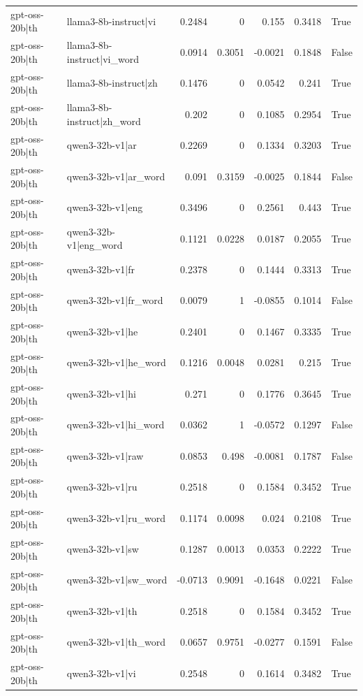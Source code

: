 \begin{table}
\begin{tabular}{l l r r r r l}
gpt-oss-20b|th & llama3-8b-instruct|vi & 0.2484 & 0 & 0.155 & 0.3418 & True \\
gpt-oss-20b|th & llama3-8b-instruct|vi_word & 0.0914 & 0.3051 & -0.0021 & 0.1848 & False \\
gpt-oss-20b|th & llama3-8b-instruct|zh & 0.1476 & 0 & 0.0542 & 0.241 & True \\
gpt-oss-20b|th & llama3-8b-instruct|zh_word & 0.202 & 0 & 0.1085 & 0.2954 & True \\
gpt-oss-20b|th & qwen3-32b-v1|ar & 0.2269 & 0 & 0.1334 & 0.3203 & True \\
gpt-oss-20b|th & qwen3-32b-v1|ar_word & 0.091 & 0.3159 & -0.0025 & 0.1844 & False \\
gpt-oss-20b|th & qwen3-32b-v1|eng & 0.3496 & 0 & 0.2561 & 0.443 & True \\
gpt-oss-20b|th & qwen3-32b-v1|eng_word & 0.1121 & 0.0228 & 0.0187 & 0.2055 & True \\
gpt-oss-20b|th & qwen3-32b-v1|fr & 0.2378 & 0 & 0.1444 & 0.3313 & True \\
gpt-oss-20b|th & qwen3-32b-v1|fr_word & 0.0079 & 1 & -0.0855 & 0.1014 & False \\
gpt-oss-20b|th & qwen3-32b-v1|he & 0.2401 & 0 & 0.1467 & 0.3335 & True \\
gpt-oss-20b|th & qwen3-32b-v1|he_word & 0.1216 & 0.0048 & 0.0281 & 0.215 & True \\
gpt-oss-20b|th & qwen3-32b-v1|hi & 0.271 & 0 & 0.1776 & 0.3645 & True \\
gpt-oss-20b|th & qwen3-32b-v1|hi_word & 0.0362 & 1 & -0.0572 & 0.1297 & False \\
gpt-oss-20b|th & qwen3-32b-v1|raw & 0.0853 & 0.498 & -0.0081 & 0.1787 & False \\
gpt-oss-20b|th & qwen3-32b-v1|ru & 0.2518 & 0 & 0.1584 & 0.3452 & True \\
gpt-oss-20b|th & qwen3-32b-v1|ru_word & 0.1174 & 0.0098 & 0.024 & 0.2108 & True \\
gpt-oss-20b|th & qwen3-32b-v1|sw & 0.1287 & 0.0013 & 0.0353 & 0.2222 & True \\
gpt-oss-20b|th & qwen3-32b-v1|sw_word & -0.0713 & 0.9091 & -0.1648 & 0.0221 & False \\
gpt-oss-20b|th & qwen3-32b-v1|th & 0.2518 & 0 & 0.1584 & 0.3452 & True \\
gpt-oss-20b|th & qwen3-32b-v1|th_word & 0.0657 & 0.9751 & -0.0277 & 0.1591 & False \\
gpt-oss-20b|th & qwen3-32b-v1|vi & 0.2548 & 0 & 0.1614 & 0.3482 & True \\

\end{tabular}
\end{table}

